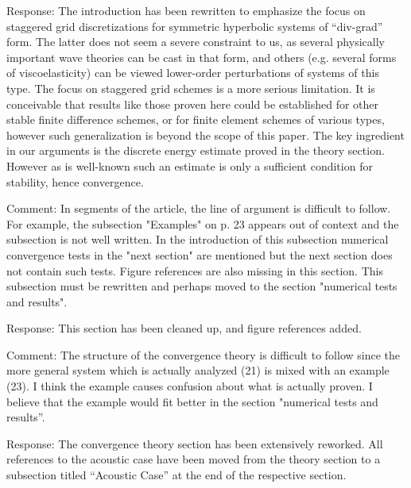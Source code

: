 Response: The introduction has been rewritten to emphasize the focus on staggered grid discretizations for symmetric hyperbolic systems of ``div-grad'' form.  The latter does not seem a severe constraint to us, as several physically important wave theories can be cast in that form, and others (e.g. several forms of viscoelasticity) can be viewed lower-order perturbations of systems of this type. The focus on staggered grid schemes is a more serious limitation. It is conceivable that results like those proven here could be established for other stable finite difference schemes, or for finite element schemes of various types, however such generalization is beyond the scope of this paper. The key ingredient in our arguments is the discrete energy estimate proved in the theory section. However as is well-known such an estimate is only a sufficient condition for stability, hence convergence.


Comment: In segments of the article, the line of argument is difficult to follow. For example, the subsection "Examples" on p. 23 appears out of context and the subsection is not well written. In the introduction of this subsection numerical convergence tests in the "next section" are mentioned but the next section does not contain such tests. Figure references are also missing in this section. This subsection must be rewritten and perhaps moved to the section "numerical tests and results".

Response: This section has been cleaned up, and figure references added. 

Comment: The structure of the convergence theory is difficult to follow since the more general system which is actually analyzed (21) is mixed with an example (23). I think the example causes confusion about what is actually proven. I believe that the example would fit better in the section "numerical tests and results”.

Response: The convergence theory section has been extensively reworked. All references to the acoustic case have been moved from the theory section to a subsection titled “Acoustic Case” at the end of the respective section.

